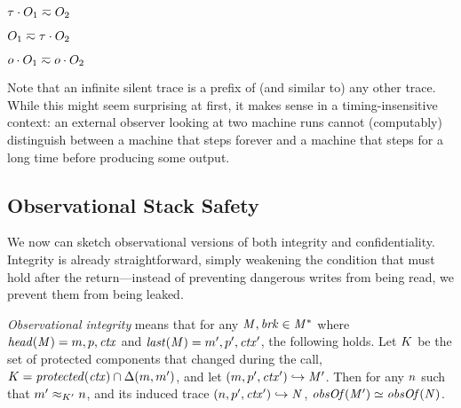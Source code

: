\documentclass[acmsmall,review,anonymous]{acmart}\settopmatter{printfolios=true,printccs=false,printacmref=false}
\begin{document}
{\begin{minipage}{.2\textwidth}
  \judgment{}{\(\obsT \eqsim \obsT\)}
\end{minipage}
\begin{minipage}{.2\textwidth}
           {\(\tau \cdot O_1 \eqsim O_2\)}
\end{minipage}
\begin{minipage}{.2\textwidth}
           {\(O_1 \eqsim \tau \cdot O_2\)}
\end{minipage}
\begin{minipage}{.2\textwidth}
           {\(o \cdot O_1 \eqsim o \cdot O_2\)}
\end{minipage}


Note that an infinite silent trace is a
prefix of (and similar to) any other trace. While this might seem
surprising at first, it makes sense in a timing-insensitive context:
an external observer looking at two machine runs cannot (computably)
distinguish between a machine that steps forever and a machine that
steps for a long time before producing some output.

\subsection{Observational Stack Safety}

We now can sketch observational versions of both integrity and confidentiality.
Integrity is already straightforward, simply weakening the condition that must hold
after the return---instead of preventing dangerous writes from being read, we
prevent them from being leaked.

{\em Observational integrity} means that for any \(\mathit{M},\mathit{brk} \in \mathit{M}^*\)
where \(\mathit{head}(\mathit{M}) = m,p,\mathit{ctx}\) and \(\mathit{last}(\mathit{M}) = m',p',\mathit{ctx}'\),
the following holds. Let \(K\) be the set of protected components that changed during
the call, \(K = \mathit{protected}(\mathit{ctx}) \cap \Delta(m, m')\),
and let \((m,p',\mathit{ctx}') \hookrightarrow \mathit{M}'\).
Then for any \(n\) such that
\(m' \approx_{K'} n\), and its induced trace
\((n,p',\mathit{ctx}') \hookrightarrow \mathit{N}\), \(\mathit{obsOf}(\mathit{M}') \simeq \mathit{obsOf}(\mathit{N})\).

}
\end{document}
